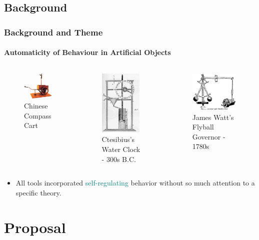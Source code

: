 \documentclass[
	11pt,
	aspectratio=169,
]{beamer}
\begin{document}
	\subsection{Background}
		\begin{frame}
		\frametitle{Background and Theme}
		\framesubtitle{Automaticity of Behaviour in Artificial Objects}
			\begin{columns}
				\begin{figure}
					\includegraphics[width=3cm]{./resources/chinesecompasscart.jpg}
					\caption{Chinese Compass Cart}
				\end{figure}
				\begin{figure}
					\includegraphics[width=2cm]{./resources/waterclock.jpg}
					\caption{Ctesibius's Water Clock - 300s B.C.}
				\end{figure}
				\begin{figure}
					\includegraphics[width=3.5cm]{./resources/flyball.png}
					\caption{James Watt's Flyball Governor - 1780s}
				\end{figure}
			\end{columns}
			\begin{itemize}
				\item<1->All tools incorporated \textcolor{teal}{self-regulating} behavior without so much attention to a specific theory.
			\end{itemize}
		\end{frame}

\section{Proposal}
\end{document}
